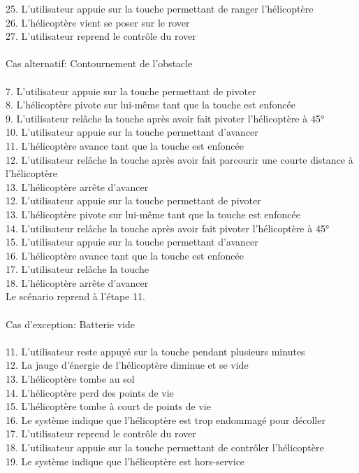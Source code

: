 \documentclass[12pt,a4paper]{scrartcl}
\begin{document}
	25.  L’utilisateur appuie sur la touche permettant de ranger l’hélicoptère\\
	26. L’hélicoptère vient se poser sur le rover\\
	27. L’utilisateur reprend le contrôle du rover\\
\\
Cas alternatif: Contournement de l’obstacle\\
\\
	7. L’utilisateur appuie sur la touche permettant de pivoter\\
	8. L’hélicoptère pivote sur lui-même tant que la touche est enfoncée\\
	9. L’utilisateur relâche la touche après avoir fait pivoter l’hélicoptère à 45°\\
	10. L’utilisateur appuie sur la touche permettant d’avancer\\
	11. L’hélicoptère avance tant que la touche est enfoncée\\
	12. L’utilisateur relâche la touche après avoir fait parcourir une courte distance à l’hélicoptère\\
	13. L’hélicoptère arrête d’avancer\\
	12. L’utilisateur appuie sur la touche permettant de pivoter\\
	13. L’hélicoptère pivote sur lui-même tant que la touche est enfoncée\\
	14. L’utilisateur relâche la touche après avoir fait pivoter l’hélicoptère à 45°\\
	15. L’utilisateur appuie sur la touche permettant d’avancer\\
	16. L’hélicoptère avance tant que la touche est enfoncée\\
	17. L’utilisateur relâche la touche\\
	18. L’hélicoptère arrête d’avancer\\

	Le scénario reprend à l’étape 11. \\
\\
Cas d’exception: Batterie vide\\
\\
	11. L’utilisateur reste appuyé sur la touche pendant plusieurs minutes\\
	12. La jauge d’énergie de l’hélicoptère diminue et se vide\\
	13. L’hélicoptère tombe au sol\\
	14. L’hélicoptère perd des points de vie\\
	15. L’hélicoptère tombe à court de points de vie\\
	16. Le système indique que l’hélicoptère est trop endommagé pour décoller\\
	17. L’utilisateur reprend le contrôle du rover\\
	18. L’utilisateur appuie sur la touche permettant de contrôler l’hélicoptère\\
	19. Le système indique que l’hélicoptère est hors-service\\
\end{document}
